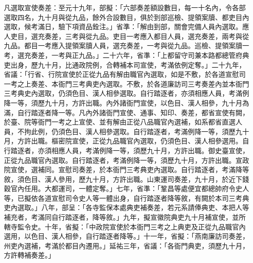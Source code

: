 \begin{pinyinscope}
 凡選取宣使奏差：至元十九年，部擬：「六部奏差額設數目，每一十名內，令各部選取四名，九十月與從九品，餘外合設數目，俱於到部巡檢、提領案牘、都吏目內選取，候考滿日，驗下項資品銓注。」省準：「解由到部，關會完備人員內選取。應人吏目，選充奏差，三考與從九品。吏目一考應入都目人員，選充奏差，兩考與從九品。都目一考應入提領案牘人員，選充奏差，一考與從九品。巡檢、提領案牘一考，選充奏差，一考與正九品。」二十六年，省準：「上都留守司兼本路都總管府典吏出身，歷九十月，比通政院例，合轉補本司宣使，考滿依例定奪。」二十九年，省議：「行省、行院宣使於正從九品有解由職官內選取，如是不敷，於各道宣慰司一考之上奏差、本衙門三考典吏內選取。不敷，於各道廉訪司三考奏差內並本衙門三考典史內選取，仍須色目、漢人相參選取。自行踏逐者，亦須相應人員，考滿例降一等，須歷九十月，方許出職。內外諸衙門宣使，以色目、漢人相參，九十月為滿，自行踏逐者降一等。凡內外諸衙門宣使、通事、知印、奏差，都省宣使有闕，於臺、院等衙門一考之上宣使、並有解由正從八品職官內選補，如系都省直選人員，不拘此例，仍須色目、漢人相參選取。自行踏逐者，考滿例降一等，須歷九十月，方許出職。樞密院宣使，正從九品職官內選取，仍須色目、漢人相參選用。自行踏逐者，亦須相應人員，考滿例降一等，須歷九十月，方許出職。御史臺宣使，正從九品職官內選取。自行踏逐者，考滿例降一等，須歷九十月，方許出職。宣政院宣使，選補同。宣慰司奏差，於本衙門三考典吏內選取。自行踏逐者，考滿降等敘，須色目、漢人參用，歷九十月，方許出職。山東運司奏差，九十月，於近下錢穀官內任用。大都運司，一體定奪。」七年，省準：「鞏昌等處便宜都總帥府令史人等，已擬依各道宣慰司令史人等一體出身，自行踏逐者降等敘，有闕於本司三考典吏內選取。」八年，部呈：「各寺監保本處典吏補奏差，若元系請俸典吏、本把人等補充者，考滿同自行踏逐者，降等敘。」九年，擬宣徽院典吏九十月補宣使，並所轄寺監令史。十年，省擬：「中政院宣使於本衙門三考之上典吏及正從九品職官內選用，以色目、漢人相參，自行踏逐者降等。」十一年，省擬：「燕南廉訪司奏差，州吏內選補，考滿於都目內遷用。」延祐三年，省議：「各衙門典吏，須歷九十月，方許轉補奏差。」




\end{pinyinscope}
